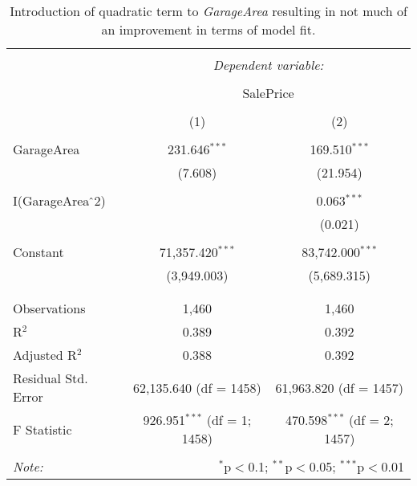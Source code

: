 \documentclass{article}
\begin{document}
\begin{table}[t]
\centering
\caption{\label{tab:quadraticgaragearea} Introduction of quadratic term to \emph{GarageArea} resulting in not much of an improvement in terms of model fit.}
\begin{tabular}{@{\extracolsep{5pt}}lcc} 
\\[-1.8ex]\hline 
\hline \\[-1.8ex] 
 & \multicolumn{2}{c}{\textit{Dependent variable:}} \\ 
\cline{2-3} 
\\[-1.8ex] & \multicolumn{2}{c}{SalePrice} \\ 
\\[-1.8ex] & (1) & (2)\\ 
\hline \\[-1.8ex] 
 GarageArea & 231.646$^{***}$ & 169.510$^{***}$ \\ 
  & (7.608) & (21.954) \\ 
  & & \\ 
 I(GarageArea$\hat{\mkern6mu}$2) &  & 0.063$^{***}$ \\ 
  &  & (0.021) \\ 
  & & \\ 
 Constant & 71,357.420$^{***}$ & 83,742.000$^{***}$ \\ 
  & (3,949.003) & (5,689.315) \\ 
  & & \\ 
\hline \\[-1.8ex] 
Observations & 1,460 & 1,460 \\ 
R$^{2}$ & 0.389 & 0.392 \\ 
Adjusted R$^{2}$ & 0.388 & 0.392 \\ 
Residual Std. Error & 62,135.640 (df = 1458) & 61,963.820 (df = 1457) \\ 
F Statistic & 926.951$^{***}$ (df = 1; 1458) & 470.598$^{***}$ (df = 2; 1457) \\ 
\hline 
\hline \\[-1.8ex] 
\textit{Note:}  & \multicolumn{2}{r}{$^{*}$p$<$0.1; $^{**}$p$<$0.05; $^{***}$p$<$0.01} \\ 
\end{tabular} 
\end{table} 
\end{document}
